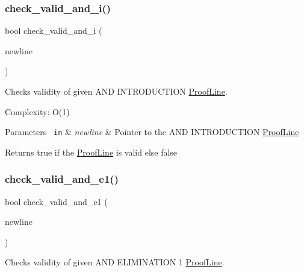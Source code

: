\subsubsection{\texorpdfstring{check\+\_\+valid\+\_\+and\+\_\+i()}{check\_valid\_and\_i()}}
{\footnotesize\ttfamily bool check\+\_\+valid\+\_\+and\+\_\+i (\begin{DoxyParamCaption}\item[{\mbox{\hyperlink{classProofLine}{Proof\+Line}} $\ast$}]{newline }\end{DoxyParamCaption})\hspace{0.3cm}{\ttfamily [related]}}



Checks validity of given A\+ND I\+N\+T\+R\+O\+D\+U\+C\+T\+I\+ON \mbox{\hyperlink{classProofLine}{Proof\+Line}}. 

Complexity\+: O(1) 
\begin{DoxyParams}[1]{Parameters}
\mbox{\texttt{ in}}  & {\em newline} & Pointer to the A\+ND I\+N\+T\+R\+O\+D\+U\+C\+T\+I\+ON \mbox{\hyperlink{classProofLine}{Proof\+Line}} \\
\hline
\end{DoxyParams}
\begin{DoxyReturn}{Returns}
true if the \mbox{\hyperlink{classProofLine}{Proof\+Line}} is valid else false 
\end{DoxyReturn}
\mbox{\label{classProofLine_abdc10668ade35c80f0fd187c837e1a77}} 
\subsubsection{\texorpdfstring{check\+\_\+valid\+\_\+and\+\_\+e1()}{check\_valid\_and\_e1()}}
{\footnotesize\ttfamily bool check\+\_\+valid\+\_\+and\+\_\+e1 (\begin{DoxyParamCaption}\item[{\mbox{\hyperlink{classProofLine}{Proof\+Line}} $\ast$}]{newline }\end{DoxyParamCaption})\hspace{0.3cm}{\ttfamily [related]}}



Checks validity of given A\+ND E\+L\+I\+M\+I\+N\+A\+T\+I\+ON 1 \mbox{\hyperlink{classProofLine}{Proof\+Line}}. 

